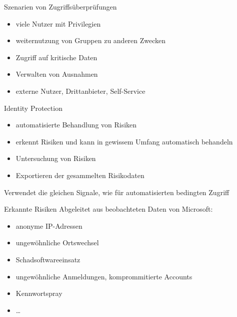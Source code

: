 \begin{flashcard}[Definition]{Szenarien von Zugriffsüberprüfungen}
  \begin{itemize}
    \item viele Nutzer mit Privilegien
    \item weiternutzung von Gruppen zu anderen Zwecken
    \item Zugriff auf kritische Daten
    \item Verwalten von Ausnahmen
    \item externe Nutzer, Drittanbieter, Self-Service
  \end{itemize}
\end{flashcard}

\begin{flashcard}[Definition]{Identity Protection}
  \begin{itemize}
    \item automatisierte Behandlung von Risiken
    \item erkennt Risiken und kann in gewissem Umfang automatisch behandeln
    \item Untersuchung von Risiken
    \item Exportieren der gesammelten Risikodaten
  \end{itemize}
  Verwendet die gleichen Signale, wie für automatisierten bedingten Zugriff
\end{flashcard}

\begin{flashcard}[Definition]{Erkannte Risiken}
  Abgeleitet aus beobachteten Daten von Microsoft:
  \begin{itemize}
    \item anonyme IP-Adressen
    \item ungewöhnliche Ortswechsel
    \item Schadsoftwareeinsatz
    \item ungewöhnliche Anmeldungen, komprommitierte Accounts
    \item Kennwortspray
    \item \ldots
  \end{itemize}
\end{flashcard}

